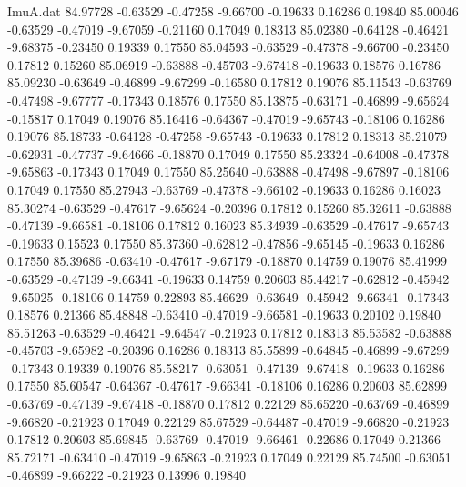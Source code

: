 \begin{filecontents}{ImuA.dat}
  84.97728   -0.63529   -0.47258   -9.66700   -0.19633    0.16286    0.19840
  85.00046   -0.63529   -0.47019   -9.67059   -0.21160    0.17049    0.18313
  85.02380   -0.64128   -0.46421   -9.68375   -0.23450    0.19339    0.17550
  85.04593   -0.63529   -0.47378   -9.66700   -0.23450    0.17812    0.15260
  85.06919   -0.63888   -0.45703   -9.67418   -0.19633    0.18576    0.16786
  85.09230   -0.63649   -0.46899   -9.67299   -0.16580    0.17812    0.19076
  85.11543   -0.63769   -0.47498   -9.67777   -0.17343    0.18576    0.17550
  85.13875   -0.63171   -0.46899   -9.65624   -0.15817    0.17049    0.19076
  85.16416   -0.64367   -0.47019   -9.65743   -0.18106    0.16286    0.19076
  85.18733   -0.64128   -0.47258   -9.65743   -0.19633    0.17812    0.18313
  85.21079   -0.62931   -0.47737   -9.64666   -0.18870    0.17049    0.17550
  85.23324   -0.64008   -0.47378   -9.65863   -0.17343    0.17049    0.17550
  85.25640   -0.63888   -0.47498   -9.67897   -0.18106    0.17049    0.17550
  85.27943   -0.63769   -0.47378   -9.66102   -0.19633    0.16286    0.16023
  85.30274   -0.63529   -0.47617   -9.65624   -0.20396    0.17812    0.15260
  85.32611   -0.63888   -0.47139   -9.66581   -0.18106    0.17812    0.16023
  85.34939   -0.63529   -0.47617   -9.65743   -0.19633    0.15523    0.17550
  85.37360   -0.62812   -0.47856   -9.65145   -0.19633    0.16286    0.17550
  85.39686   -0.63410   -0.47617   -9.67179   -0.18870    0.14759    0.19076
  85.41999   -0.63529   -0.47139   -9.66341   -0.19633    0.14759    0.20603
  85.44217   -0.62812   -0.45942   -9.65025   -0.18106    0.14759    0.22893
  85.46629   -0.63649   -0.45942   -9.66341   -0.17343    0.18576    0.21366
  85.48848   -0.63410   -0.47019   -9.66581   -0.19633    0.20102    0.19840
  85.51263   -0.63529   -0.46421   -9.64547   -0.21923    0.17812    0.18313
  85.53582   -0.63888   -0.45703   -9.65982   -0.20396    0.16286    0.18313
  85.55899   -0.64845   -0.46899   -9.67299   -0.17343    0.19339    0.19076
  85.58217   -0.63051   -0.47139   -9.67418   -0.19633    0.16286    0.17550
  85.60547   -0.64367   -0.47617   -9.66341   -0.18106    0.16286    0.20603
  85.62899   -0.63769   -0.47139   -9.67418   -0.18870    0.17812    0.22129
  85.65220   -0.63769   -0.46899   -9.66820   -0.21923    0.17049    0.22129
  85.67529   -0.64487   -0.47019   -9.66820   -0.21923    0.17812    0.20603
  85.69845   -0.63769   -0.47019   -9.66461   -0.22686    0.17049    0.21366
  85.72171   -0.63410   -0.47019   -9.65863   -0.21923    0.17049    0.22129
  85.74500   -0.63051   -0.46899   -9.66222   -0.21923    0.13996    0.19840
\end{filecontents}
